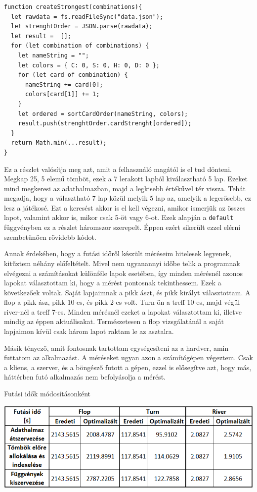 \begin{lstlisting}[style=htmlcssjs]
function createStrongest(combinations){
  let rawdata = fs.readFileSync("data.json");
  let strenghtOrder = JSON.parse(rawdata);
  let result =  [];
  for (let combination of combinations) {
    let nameString = "";
    let colors = { C: 0, S: 0, H: 0, D: 0 };
    for (let card of combination) {
      nameString += card[0];
      colors[card[1]] += 1;
    }
    let ordered = sortCardOrder(nameString, colors);
    result.push(strenghtOrder.cardStrenght[ordered]);
  }
  return Math.min(...result);
}
\end{lstlisting}

Ez a részlet valósítja meg azt, amit a felhasználó magától is el tud dönteni. Megkap 25, 5 elemű tömböt, ezek a 7 lerakott lapból kiválasztható 5 lap. Ezeket mind megkeresi az adathalmazban, majd a legkisebb értékűvel tér vissza. Tehát megadja, hogy a választható 7 lap közül melyik 5 lap az, amelyik a legerősebb, ez lesz a játékosé. Ezt a keresést akkor is el kell végezni, amikor ismerjük az összes lapot, valamint akkor is, mikor csak 5-öt vagy 6-ot. Ezek alapján a \texttt{default} függvényben ez a részlet háromszor szerepelt. Éppen ezért sikerült ezzel elérni szembetűnően rövidebb kódot.


Annak érdekében, hogy a futási időről készült méréseim hitelesek legyenek, kitűztem néhány előfeltételt. Mivel nem ugyanannyi időbe telik a programnak elvégezni a számításokat különféle lapok esetében, így minden mérésnél azonos lapokat választottam ki, hogy a mérést pontosnak tekinthessem. Ezek a következőek voltak. Saját lapjaimnak a pikk ászt, és pikk királyt választottam. A flop a pikk ász, pikk 10-es, és pikk 2-es volt. Turn-ön a treff 10-es, majd végül river-nél a treff 7-es. Minden mérésnél ezeket a lapokat választottam ki, illetve mindig az éppen aktuálisakat. Természetesen a flop vizsgálatánál a saját lapjaimon kívül csak három lapot raktam le az asztalra.

Másik tényező, amit fontosnak tartottam egységesíteni az a hardver, amin futtatom az alkalmazást. A méréseket ugyan azon a számítógépen végeztem. Csak a kliens, a szerver, és a böngésző futott a gépen, ezzel is elősegítve azt, hogy más, háttérben futó alkalmazás nem befolyásolja a mérést. 

\begin{table}[h]
\centering
\caption{Futási idők módosításonként}
\label{tab:running-time}
\medskip
\includegraphics[width=\textwidth]{images/running-time.png}
\end{table}

